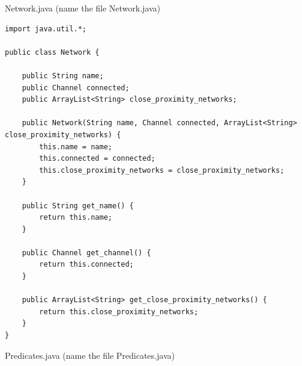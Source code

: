 \documentclass{article}
\begin{document}
Network.java (name the file Network.java)
\begin{lstlisting}
import java.util.*;

public class Network {

    public String name;
    public Channel connected;
    public ArrayList<String> close_proximity_networks;

    public Network(String name, Channel connected, ArrayList<String> close_proximity_networks) {
        this.name = name;
        this.connected = connected;
        this.close_proximity_networks = close_proximity_networks;
    }

    public String get_name() {
        return this.name;
    }

    public Channel get_channel() {
        return this.connected;
    }

    public ArrayList<String> get_close_proximity_networks() {
        return this.close_proximity_networks;
    }
}
\end{lstlisting}
Predicates.java (name the file Predicates.java)
\end{document}
